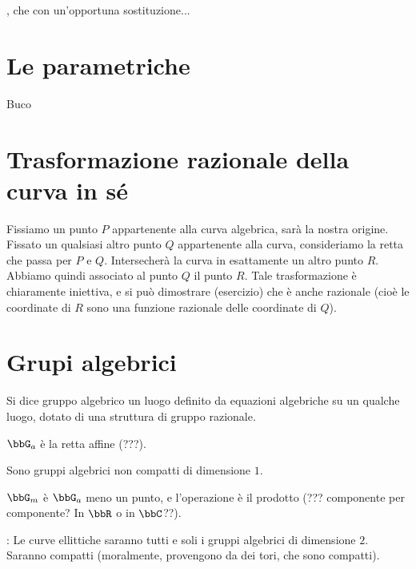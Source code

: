 , che con un'opportuna sostituzione...

\section{Le parametriche}
Buco

\section{Trasformazione razionale della curva in sé}
Fissiamo un punto $P$ appartenente alla curva algebrica, sarà la nostra origine. Fissato un qualsiasi altro punto $Q$
appartenente alla curva, consideriamo la retta che passa per $P$ e $Q$. Intersecherà la curva in esattamente un altro punto $R$.
Abbiamo quindi associato al punto $Q$ il punto $R$. Tale trasformazione è chiaramente iniettiva, e si può dimostrare (esercizio)
che è anche razionale (cioè le coordinate di $R$ sono una funzione razionale delle coordinate di $Q$).

\section{Grupi algebrici}
\begin{definizione}
Si dice gruppo algebrico un luogo definito da equazioni algebriche 
su un qualche luogo, dotato di una struttura di gruppo razionale.
\end{definizione}

\begin{definizione}
$\bbG_a$ è la retta affine (???).
\end{definizione}

\begin{osservazione}
Sono gruppi algebrici non compatti di dimensione $1$.
\end{osservazione}

\begin{definizione}
$\bbG_m$ è $\bbG_a$ meno un punto, e l'operazione è il prodotto (??? componente per componente?
In $\bbR$ o in $\bbC$??).
\end{definizione}


:
Le curve ellittiche saranno tutti e soli i gruppi algebrici di dimensione $2$. Saranno compatti
(moralmente, provengono da dei tori, che sono compatti).


